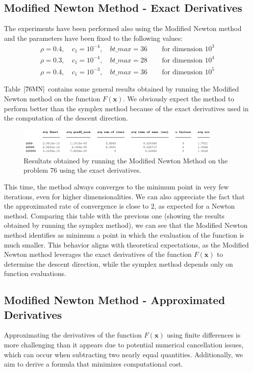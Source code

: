 \medskip
\subsection*{Modified Newton Method - Exact Derivatives}
The experiments have been performed also using the Modified Newton method and the parameters have been fixed to the following values:
\begin{align*}
    \rho =  0.4, \quad c_1 = 10^{-4}, \quad bt\_max = 36 \quad &\text{ for dimension } 10^3 \\
    \rho =  0.3, \quad c_1 = 10^{-4}, \quad bt\_max = 28 \quad &\text{ for dimension } 10^4 \\
    \rho =  0.4, \quad c_1 = 10^{-3}, \quad bt\_max = 36 \quad &\text{ for dimension } 10^5 
\end{align*}

Table $\eqref{76MN}$ contains some general results obtained by running the Modified Newton method on the function $F(\mathbf{x})$.
We obviously expect the method to perform better than the symplex method because of the exact derivatives used in the computation of the descent direction.

\begin{figure}[htbp]
    \centering
    \includegraphics[width = 0.9\textwidth]{img/pb76_table_MN.png}
    \caption{Resultats obtained by running the Modified Newton Method on the problem $76$ using the exact derivatives.}
    \label{76MN}
\end{figure}

This time, the method always converges to the minimum point in very few iterations, even for higher dimensionalities. 
We can also appreciate the fact that the approximated rate of convergence is close to $2$, as expected for a Newton method.
Comparing this table with the previous one (showing the results obtained by running the symplex method), we can see that the Modified Newton method identifies as minimum a point in which the evaluation of the function is much smaller. 
This behavior aligns with theoretical expectations, as the Modified Newton method leverages the exact derivatives of the function $F(\mathbf{x})$ to determine the descent direction, while the symplex method depends only on function evaluations.

\medskip
\subsection*{Modified Newton Method - Approximated Derivatives}
Approximating the derivatives of the function $F(\mathbf{x})$ using finite differences is more challenging than it appears due to potential numerical cancellation issues, which can occur when subtracting two nearly equal quantities. Additionally, we aim to derive a formula that minimizes computational cost.

